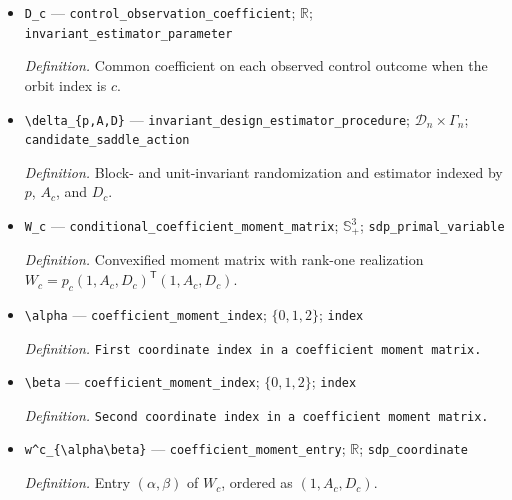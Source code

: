 \documentclass{article}
\begin{document}
\begin{itemize}
  \par\smallskip\noindent\emph{Definition.} Common coefficient on each observed isolated-treated outcome when the orbit index is \(c\).
  \item \texttt{D\_\allowbreak{}c} --- \texttt{control\_\allowbreak{}observation\_\allowbreak{}coefficient}; \(\mathbb R\); \texttt{invariant\_\allowbreak{}estimator\_\allowbreak{}parameter}
  \par\smallskip\noindent\emph{Definition.} Common coefficient on each observed control outcome when the orbit index is \(c\).
  \item \texttt{\textbackslash{}\allowbreak{}delta\_\allowbreak{}\{p,\allowbreak{}A,\allowbreak{}D\}\allowbreak{}} --- \texttt{invariant\_\allowbreak{}design\_\allowbreak{}estimator\_\allowbreak{}procedure}; \(\mathcal D_n\times\Gamma_n\); \texttt{candidate\_\allowbreak{}saddle\_\allowbreak{}action}
  \par\smallskip\noindent\emph{Definition.} Block- and unit-invariant randomization and estimator indexed by \(p\), \(A_c\), and \(D_c\).
  \item \texttt{W\_\allowbreak{}c} --- \texttt{conditional\_\allowbreak{}coefficient\_\allowbreak{}moment\_\allowbreak{}matrix}; \(\mathbb S_+^3\); \texttt{sdp\_\allowbreak{}primal\_\allowbreak{}variable}
  \par\smallskip\noindent\emph{Definition.} Convexified moment matrix with rank-one realization \(W_c=p_c(1,A_c,D_c)^{\mathsf T}(1,A_c,D_c)\).
  \item \texttt{\textbackslash{}\allowbreak{}alpha} --- \texttt{coefficient\_\allowbreak{}moment\_\allowbreak{}index}; \(\{0,1,2\}\); \texttt{index}
  \par\smallskip\noindent\emph{Definition.} \texttt{First coordinate index in a coefficient moment matrix.}
  \item \texttt{\textbackslash{}\allowbreak{}beta} --- \texttt{coefficient\_\allowbreak{}moment\_\allowbreak{}index}; \(\{0,1,2\}\); \texttt{index}
  \par\smallskip\noindent\emph{Definition.} \texttt{Second coordinate index in a coefficient moment matrix.}
  \item \texttt{w\textasciicircum{}c\_\allowbreak{}\{\textbackslash{}\allowbreak{}alpha\textbackslash{}\allowbreak{}beta\}\allowbreak{}} --- \texttt{coefficient\_\allowbreak{}moment\_\allowbreak{}entry}; \(\mathbb R\); \texttt{sdp\_\allowbreak{}coordinate}
  \par\smallskip\noindent\emph{Definition.} Entry \((\alpha,\beta)\) of \(W_c\), ordered as \((1,A_c,D_c)\).

\end{itemize}
\end{document}

